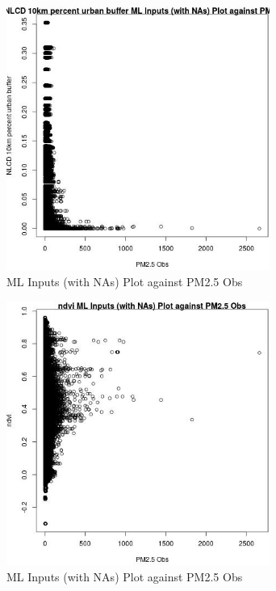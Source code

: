 \begin{figure} 
\centering  
\includegraphics[width=0.77\textwidth]{Code_Outputs/Report_ML_input_PM25_Step4_part_e_de_duplicated_aves_compiled_2019-05-20wNAs_NLCD_10km_percent_urban_buffervPM25_Obs.jpg} 
\caption{\label{fig:Report_ML_input_PM25_Step4_part_e_de_duplicated_aves_compiled_2019-05-20wNAsNLCD_10km_percent_urban_buffervPM25_Obs}ML Inputs (with NAs) Plot against PM2.5 Obs} 
\end{figure} 
 

\clearpage 

\begin{figure} 
\centering  
\includegraphics[width=0.77\textwidth]{Code_Outputs/Report_ML_input_PM25_Step4_part_e_de_duplicated_aves_compiled_2019-05-20wNAs_ndvivPM25_Obs.jpg} 
\caption{\label{fig:Report_ML_input_PM25_Step4_part_e_de_duplicated_aves_compiled_2019-05-20wNAsndvivPM25_Obs}ML Inputs (with NAs) Plot against PM2.5 Obs} 
\end{figure} 
 
